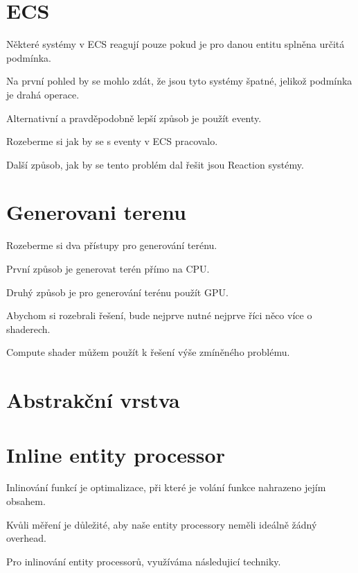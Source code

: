 \section{ECS}

Některé systémy v ECS reagují pouze pokud je pro danou entitu splněna určitá podmínka.

Na první pohled by se mohlo zdát, že jsou tyto systémy špatné, jelikož podmínka je drahá operace.

Alternativní a pravděpodobně lepší způsob je použít eventy.

Rozeberme si jak by se s eventy v ECS pracovalo.

Další způsob, jak by se tento problém dal řešit jsou Reaction systémy.


\section{Generovani terenu}

Rozeberme si dva přístupy pro generování terénu.

První způsob je generovat terén přímo na CPU.

Druhý způsob je pro generování terénu použít GPU.


Abychom si rozebrali řešení, bude nejprve nutné nejprve říci něco více o shaderech.

Compute shader můžem použít k řešení výše zmíněného problému.


\section{Abstrakční vrstva}


\section{Inline entity processor}

Inlinování funkcí je optimalizace, při které je volání funkce nahrazeno jejím obsahem.


Kvůli měření je důležité, aby naše entity processory neměli ideálně žádný overhead.

Pro inlinování entity processorů, využíváma následujicí techniky.



\fi
